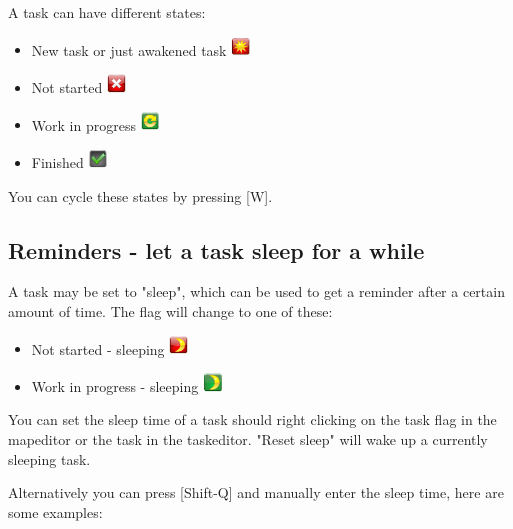 \documentclass[12pt,a4paper]{article}
\newcommand{\key}[1]{[#1]}
\begin{document}
A task can have different states:
\begin{itemize}
    \item New task or just awakened task \includegraphics[width=0.5cm]{images/flags/system/task-new.png}
    \item Not started \includegraphics[width=0.5cm]{images/flags/system/task-not-started.png}
    \item Work in progress \includegraphics[width=0.5cm]{images/flags/system/task-wip.png}
    \item Finished \includegraphics[width=0.5cm]{images/flags/system/task-finished.png}
\end{itemize}
You can cycle these states by pressing \key{W}. 

\subsection{Reminders - let a task sleep for a while}
A task may be set to "sleep", which can be used to get a reminder
after a certain amount of time. The flag will change to one of these:
\begin{itemize}
    \item Not started - sleeping
    \includegraphics[width=0.5cm]{images/flags/system/task-new-sleeping.png}
    \item Work in progress - sleeping
    \includegraphics[width=0.5cm]{images/flags/system/task-wip-sleeping.png}
\end{itemize}
You can set the sleep time of a task should right clicking on the task flag in the
mapeditor or the task in the taskeditor. "Reset sleep" will wake up
a currently sleeping task. 

Alternatively you can press \key{Shift-Q} and manually enter the sleep time, here are some examples:
\end{document}
